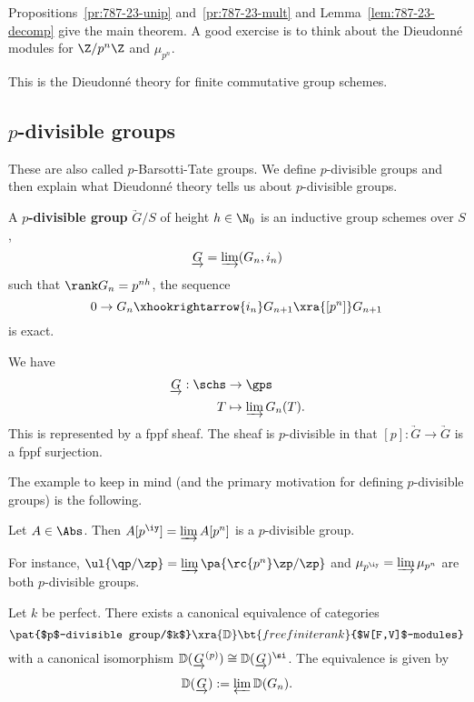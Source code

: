 Propositions~\ref{pr:787-23-unip} and~\ref{pr:787-23-mult} and Lemma~\ref{lem:787-23-decomp} give the main theorem. A good exercise is to think about the Dieudonn\'e modules for $\Z/p^n\Z$ and $\mu_{p^n}$.

This is the Dieudonn\'e theory for finite commutative group schemes.

\subsection{$p$-divisible groups}
These are also called $p$-Barsotti-Tate groups. We define $p$-divisible groups and then explain what Dieudonn\'e theory tells us about $p$-divisible groups.
\begin{df}
A \textbf{$p$-divisible group} $\underrightarrow{G}/S$ of height $h\in \N_0$ is an inductive group schemes over $S$,
\[\underrightarrow{G}
=\varinjlim(G_n,i_n)
\]
such that $\rank G_n=p^{nh}$, the sequence
\[
0\to G_n \xhookrightarrow{i_n} G_{n+1} \xra{[p^n]} G_{n+1}
\]
is exact.

We have
\begin{align*}
\underrightarrow G:\schs &\to \gps\\
T&\mapsto \varinjlim G_n(T).
\end{align*}
This is represented by a fppf sheaf. The sheaf is $p$-divisible in that $[p]:\underrightarrow G\to \underrightarrow G$ is a fppf surjection.
\end{df}
The example to keep in mind (and the primary motivation for defining $p$-divisible groups) is the following.
\begin{ex}
Let $A\in \Abs$. Then $A[p^{\iy}]=\varinjlim A[p^n]$ is a $p$-divisible group.

For instance, $\ul{\qp/\zp}=\varinjlim \pa{\rc{p^n}\zp/\zp}$ and $\mu_{p^{\iy}}=\varinjlim \mu_{p^n}$ are both $p$-divisible groups. 
\end{ex}
\begin{thm}
Let $k$ be perfect. There exists a canonical equivalence of categories
\[
\pat{$p$-divisible group/$k$}\xra{\mathbb D}\bt{free finite rank}{$W[F,V]$-modules}
\]
with a canonical isomorphism $\mathbb D(\underrightarrow{G}^{(p)})\cong \mathbb D(\underrightarrow{G})^{\si}$.
The equivalence is given by
\[
\mathbb D(\underrightarrow{G}):=\varprojlim \mathbb D(G_n).
\]
\end{thm}

